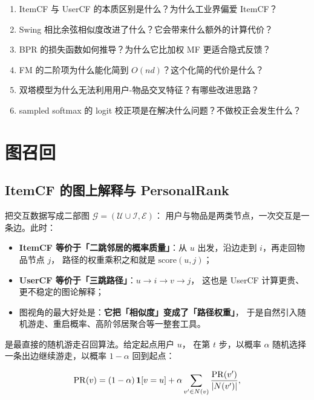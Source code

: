 \begin{interview}[阶段性面试追问]
\begin{enumerate}
  \item ItemCF 与 UserCF 的本质区别是什么？为什么工业界偏爱 ItemCF？
  \item Swing 相比余弦相似度改进了什么？它会带来什么额外的计算代价？
  \item BPR 的损失函数如何推导？为什么它比加权 MF 更适合隐式反馈？
  \item FM 的二阶项为什么能化简到 $O(nd)$？这个化简的代价是什么？
  \item 双塔模型为什么无法利用用户-物品交叉特征？有哪些改进思路？
  \item sampled softmax 的 logit 校正项是在解决什么问题？不做校正会发生什么？
\end{enumerate}
\end{interview}

\section{图召回}

\subsection{ItemCF 的图上解释与 PersonalRank}

把交互数据写成二部图 $\mathcal{G} = (\mathcal{U} \cup \mathcal{I}, \mathcal{E})$：
用户与物品是两类节点，一次交互是一条边。此时：

\begin{itemize}
  \item \textbf{ItemCF 等价于「二跳邻居的概率质量」}：从 $u$ 出发，沿边走到 $i$，再走回物品节点 $j$，
        路径的权重乘积之和就是 $\text{score}(u,j)$；
  \item \textbf{UserCF 等价于「三跳路径」}：$u \to i \to v \to j$，
        这也是 UserCF 计算更贵、更不稳定的图论解释；
  \item 图视角的最大好处是：\textbf{它把「相似度」变成了「路径权重」}，
        于是自然引入随机游走、重启概率、高阶邻居聚合等一整套工具。
\end{itemize}

 是最直接的随机游走召回算法。给定起点用户 $u$，
在第 $t$ 步，以概率 $\alpha$ 随机选择一条出边继续游走，以概率 $1-\alpha$ 回到起点：

\begin{equation}
\mathrm{PR}(v) = (1 - \alpha) \, \mathbf{1}[v = u] + \alpha \sum_{v' \in N(v)} \frac{\mathrm{PR}(v')}{\left\lvert N(v') \right\rvert} ,
\label{eq:personalrank}
\end{equation}

